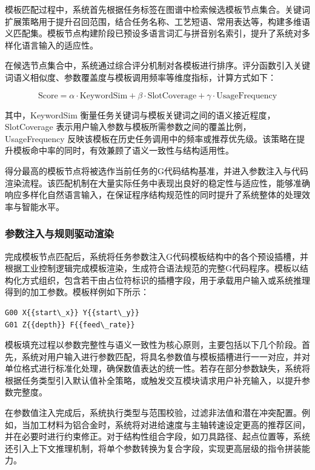 \documentclass[preprint,12pt]{elsarticle}
\begin{document}
模板匹配过程中，系统首先根据任务标签在图谱中检索候选模板节点集合。关键词扩展策略用于提升召回范围，结合任务名称、工艺短语、常用表达等，构建多维语义匹配集。模板节点构建阶段已预设多语言词汇与拼音别名索引，提升了系统对多样化语言输入的适应性。

在候选节点集合中，系统通过综合评分机制对各模板进行排序。评分函数引入关键词语义相似度、参数覆盖度与模板调用频率等维度指标，计算方式如下：

\begin{equation}
    \text{Score} = \alpha \cdot \text{KeywordSim} + \beta \cdot \text{SlotCoverage} + \gamma \cdot \text{UsageFrequency}
\end{equation}

其中，KeywordSim 衡量任务关键词与模板关键词之间的语义接近程度，SlotCoverage 表示用户输入参数与模板所需参数之间的覆盖比例，UsageFrequency 反映该模板在历史任务调用中的频率或推荐优先级。该策略在提升模板命中率的同时，有效兼顾了语义一致性与结构适用性。

得分最高的模板节点将被选作当前任务的G代码结构基准，并进入参数注入与代码渲染流程。该匹配机制在大量实际任务中表现出良好的稳定性与适应性，能够准确响应多样化自然语言输入，在保证程序结构规范性的同时提升了系统整体的处理效率与智能水平。

\subsubsection{参数注入与规则驱动渲染}

完成模板节点匹配后，系统将任务参数注入G代码模板结构中的各个预设插槽，并根据工业控制逻辑完成模板渲染，生成符合语法规范的完整G代码程序。模板以结构化方式组织，包含若干由占位符标识的插槽字段，用于承载用户输入或系统推理得到的加工参数。模板样例如下所示：

\begin{verbatim}
G00 X{{start\_x}} Y{{start\_y}}
G01 Z{{depth}} F{{feed\_rate}}
\end{verbatim}

模板填充过程以参数完整性与语义一致性为核心原则，主要包括以下几个阶段。首先，系统对用户输入进行参数匹配，将具名参数值与模板插槽进行一一对应，并对单位格式进行标准化处理，确保数值表达的统一性。若存在部分参数缺失，系统将根据任务类型引入默认值补全策略，或触发交互模块请求用户补充输入，以提升参数完整度。

在参数值注入完成后，系统执行类型与范围校验，过滤非法值和潜在冲突配置。例如，当加工材料为铝合金时，系统将对进给速度与主轴转速设定更高的推荐区间，并在必要时进行约束修正。对于结构性组合字段，如刀具路径、起点位置等，系统还引入上下文推理机制，将单个参数转换为复合字段，实现更高层级的指令拼装能力。
\end{document}
